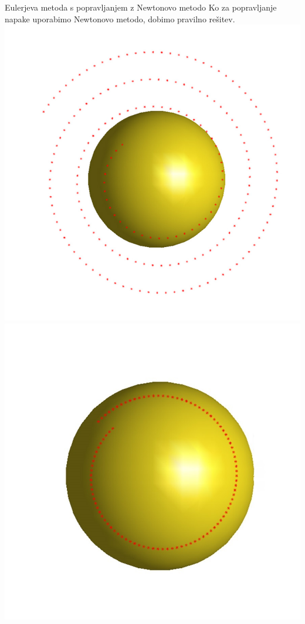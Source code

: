 \documentclass{beamer}
\begin{document}
\begin{frame}{Eulerjeva metoda s popravljanjem z Newtonovo metodo}
	Ko za popravljanje napake uporabimo Newtonovo metodo, dobimo pravilno rešitev.
	\includegraphics[scale=0.2]{eul2}
	\includegraphics[scale=0.2]{eul1}

\end{frame}
\end{document}
